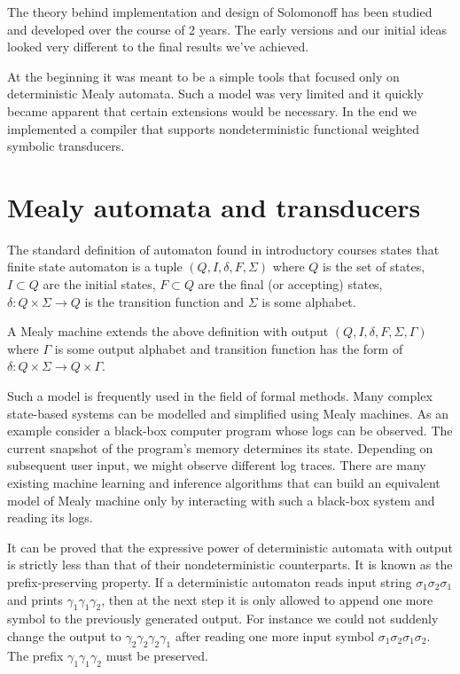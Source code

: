 

The theory behind implementation and design of Solomonoff has been studied and developed over the course of 2 years. The early versions and our initial ideas looked very different to the final results we've achieved. 

At the beginning it was meant to be a simple tools that focused only on deterministic Mealy automata. Such a model was very limited and it quickly became apparent that certain extensions would be necessary. In the end we implemented a compiler that supports nondeterministic functional weighted symbolic transducers. 

\section{Mealy automata and transducers}

The standard definition of automaton found in introductory courses\cite{sipser}\cite{EILENBERG}\cite{EILENBERG2} states that finite state automaton is  a tuple $(Q,I,\delta,F,\Sigma)$ where $Q$ is the set of states, $I \subset Q$ are the initial states,  $F \subset Q$ are the final (or accepting) states, $\delta:Q\times \Sigma \rightarrow Q$ is the transition function and $\Sigma$ is some alphabet. 

A Mealy machine\cite{mealy} extends the above definition with output  $(Q,I,\delta,F,\Sigma,\Gamma)$ where $\Gamma$ is some output alphabet and transition function has the form of $\delta:Q\times \Sigma \rightarrow Q \times \Gamma$. 

Such a model is frequently used in the field of formal methods. Many complex state-based systems can be modelled and simplified using Mealy machines\cite{de_la_higuera}. As an example consider a black-box computer program whose logs can be observed\cite{register_automata_learning}. The current snapshot of the program's memory determines its state. Depending on subsequent user input, we might observe different log traces. There are many existing machine learning and inference algorithms that can build an equivalent model of Mealy machine only by interacting with such a black-box system and reading its logs. 

It can be proved that the expressive power of deterministic automata with output is strictly less than that of their nondeterministic counterparts\cite{MendozaDrosik2020MultitapeAA}. It is known as the prefix-preserving  property\cite{de_la_higuera}. If a deterministic automaton reads input string $\sigma_1\sigma_2\sigma_1$ and prints $\gamma_1\gamma_1\gamma_2$, then at the next step it is only allowed to append one more symbol to the previously generated output. For instance we could not suddenly change the output to $\gamma_2\gamma_2\gamma_2\gamma_1$ after reading one more input symbol $\sigma_1\sigma_2\sigma_1\sigma_2$. The prefix $\gamma_1\gamma_1\gamma_2$ must be preserved. 


